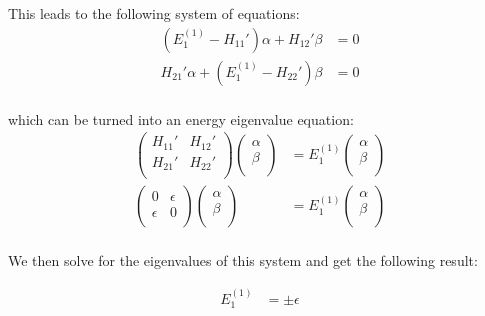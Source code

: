 \documentclass[10pt]{article} %
\begin{document}
This leads to the following system of equations:\\

\begin{align*}
  \left(E_1^{(1)} - H_{11}'\right)\alpha + H_{12}'\beta &= 0\\
  H_{21}'\alpha + \left(E_1^{(1)} - H_{22}'\right)\beta &= 0\\
\end{align*}

which can be turned into an energy eigenvalue equation:\\

\begin{align*}
  \begin{pmatrix}
    H_{11}' & H_{12}'\\
    H_{21}' & H_{22}'\\
  \end{pmatrix}
  \begin{pmatrix}
    \alpha\\
    \beta\\
  \end{pmatrix}
  &=
  E_1^{(1)}
  \begin{pmatrix}
    \alpha\\
    \beta\\
  \end{pmatrix}\\
  \begin{pmatrix}
    0 & \epsilon\\
    \epsilon & 0\\
  \end{pmatrix}
  \begin{pmatrix}
    \alpha\\
    \beta\\
  \end{pmatrix}
  &=
  E_1^{(1)}
  \begin{pmatrix}
    \alpha\\
    \beta\\
  \end{pmatrix}\\
\end{align*}

We then solve for the eigenvalues of this system and get the following result:

\begin{align*}
  E_1^{(1)} &= \pm \epsilon\\
\end{align*}
\end{document}
